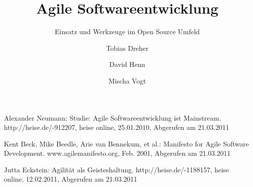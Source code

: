 \documentclass[german,english]{header}
\begin{document}

\title{Agile Softwareentwicklung}
\subtitle{Einsatz und Werkzeuge im Open Source Umfeld}
\author{Tobias Dreher\and David Henn\and Mischa Vogt}

\maketitle




%


\begin{thebibliography}{5}
Alexander Neumann:
Studie: Agile Softwareentwicklung ist Mainstream.
http://heise.de/-912207, heise online, 25.01.2010, Abgerufen am 21.03.2011

Kent Beck, Mike Beedle, Arie van Bennekum, et al.: 
Manifesto for Agile Software Development.
www.agilemanifesto.org, Feb. 2001, Abgerufen am 21.03.2011

Jutta Eckstein: 
Agilität als Geisteshaltung.
http://heise.de/-1188157, heise online, 12.02.2011, Abgerufen am 21.03.2011
\end{thebibliography}
\end{document}
